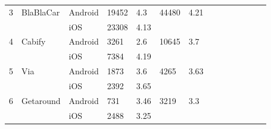 \documentclass[12pt]{article}
\begin{document}
\begin{table}
\begin{tabular}{p{0.5cm}lp{1.5cm}lp{2cm}lp{2cm}lp{2cm}lp{2cm}lp{2cm}l}
3           & BlaBlaCar         & Android     & 19452                                                                    & 4.3                                                                        & 44480                                                                             & 4.21                               \\
           &                   & iOS         & 23308                                                                    & 4.13                                                                       &                                                                                   &                                    \\
4           & Cabify            & Android     & 3261                                                                     & 2.6                                                                        & 10645                                                                             & 3.7                                \\
           &                   & iOS         & 7384                                                                     & 4.19                                                                       &                                                                                   &                                    \\
5           & Via               & Android     & 1873                                                                     & 3.6                                                                        & 4265                                                                              & 3.63                               \\
          &                   & iOS         & 2392                                                                     & 3.65                                                                       &                                                                                   &                                    \\
6           & Getaround         & Android     & 731                                                                      & 3.46                                                                       & 3219                                                                              & 3.3                                \\
            &                   & iOS         & 2488                                                                     & 3.25                                                                       &                                                                                   &                                    \\

\end{tabular}
\end{table}
\end{document}
